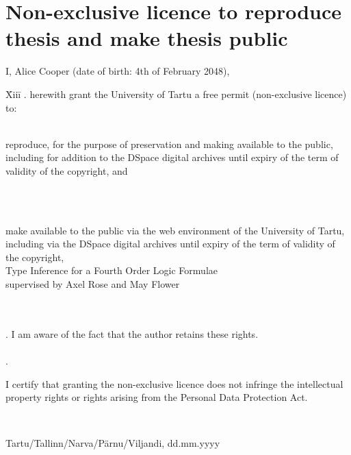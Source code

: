 \documentclass[12pt]{article}
\newcommand{\TODO}{\todo[inline]}
\begin{document}






\newpage



\appendix
\pagebreak
\section*{\small Non-exclusive licence to reproduce thesis and make thesis public}


I, Alice Cooper (date of birth: 4th of February 2048),

\begin{tabbing}
\= Xiii\=\kill
{}. \> herewith grant the University of Tartu a free permit (non-exclusive licence) to:\\\\ 

\> 
\begin{minipage}[t]{14.2cm}
reproduce, for the purpose of preservation and making available to the public, including for addition to the DSpace digital archives until expiry of the term of validity of the copyright, and
\end{minipage}
\\\\
\begin{minipage}[t]{14.2cm}
make available to the public via the web environment of the University of Tartu, including via the DSpace digital archives until expiry of the term of validity of the copyright,\\ 

Type Inference for a Fourth Order Logic Formulae\\   

supervised by Axel Rose and May Flower

\end{minipage}\\\\ 
. \>I am aware of the fact that the author retains these rights.\\\\
. \>
\begin{minipage}[t]{14.2cm}
I certify that granting the non-exclusive licence does not infringe the intellectual property rights or rights arising from the Personal Data Protection Act. 
\end{minipage}\\
\end{tabbing}

\noindent
Tartu/Tallinn/Narva/Pärnu/Viljandi, dd.mm.yyyy
\end{document}
